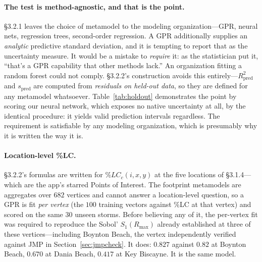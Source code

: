 \documentclass[11pt]{article}
\begin{document}
\paragraph{The test is method-agnostic, and that is the point.} §3.2.1 leaves the
choice of metamodel to the modeling organization---GPR, neural nets, regression trees,
second-order regression. A GPR additionally supplies an \emph{analytic} predictive
standard deviation, and it is tempting to report that as the uncertainty measure. It
would be a mistake to \emph{require} it: as the statistician put it, ``that's a GPR
capability that other methods lack.'' An organization fitting a random forest could
not comply. §3.2.2's construction avoids this entirely---$R^2_{\text{pred}}$ and
$s_{\text{pred}}$ are computed from \emph{residuals on held-out data}, so they are
defined for any metamodel whatsoever. Table~\ref{tab:holdout} demonstrates the point
by scoring our neural network, which exposes no native uncertainty at all, by the
identical procedure: it yields valid prediction intervals regardless. The requirement
is satisfiable by any modeling organization, which is presumably why it is written the
way it is.

\paragraph{Location-level \%LC.} §3.2.2's formulas are written for $\%LC_c(i,x,y)$ at
the five locations of §3.1.4---which are the app's starred Points of Interest. The
footprint metamodels are aggregates over $682$ vertices and cannot answer a
location-level question, so a GPR is fit \emph{per vertex} (the $100$ training vectors
against \%LC at that vertex) and scored on the same $30$ unseen storms. Before
believing any of it, the per-vertex fit was required to reproduce the Sobol'
$S_1(R_{\max})$ already established at three of these vertices---including Boynton
Beach, the vertex independently verified against JMP in Section~\ref{sec:jmpcheck}. It
does: $0.827$ against $0.82$ at Boynton Beach, $0.670$ at Dania Beach, $0.417$ at Key
Biscayne. It is the same model.
\end{document}
